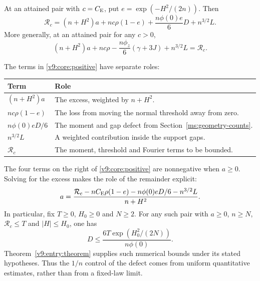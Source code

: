 \begin{theorem}\label{revision:contact-conservation}
At an attained pair with $c=C_{\mathrm E}$, put $e=\exp(-H^2/(2n))$. Then
\begin{equation}\label{v9:core:positive}
 \mathcal R_c=(n+H^2)a+nc\rho(1-e)+\frac{n\phi(0)e}{6}D+n^{3/2}L.
\end{equation}
More generally, at an attained pair for any $c>0$,
\begin{equation}\label{v9:core:conservation}
 (n+H^2)a+nc\rho-\frac{n\phi_z}{6}(\gamma+3J)+n^{3/2}L=\mathcal R_c.
\end{equation}
\end{theorem}
The terms in \eqref{v9:core:positive} have separate roles:
\begin{center}\small
\begin{tabular}{@{}p{.40\linewidth}p{.54\linewidth}@{}}
\toprule
Term & Role \\
\midrule
$(n+H^2)a$ & The excess, weighted by $n+H^2$. \\
$nc\rho(1-e)$ & The loss from moving the normal threshold away from zero. \\
$n\phi(0)eD/6$ & The moment and gap defect from Section~\ref{ms:geometry-counts}. \\
$n^{3/2}L$ & A weighted contribution inside the support gaps. \\
$\mathcal R_c$ & The moment, threshold and Fourier terms to be bounded. \\
\bottomrule
\end{tabular}
\end{center}
The four terms on the right of \eqref{v9:core:positive} are nonnegative
when $a\ge0$. Solving for
the excess makes the role of the remainder explicit:
\begin{equation}\label{opus:excess-identity}
 a=\frac{\mathcal R_c-nC_{\mathrm E}\rho(1-e)-n\phi(0)eD/6-n^{3/2}L}
             {n+H^2}.
\end{equation}
In particular, fix $T\ge0$, $H_0\ge0$ and $N\ge2$. For any such pair
with $a\ge0$, $n\ge N$, $\mathcal R_c\le T$ and $|H|\le H_0$, one has
\[
 D\le\frac{6T\exp(H_0^2/(2N))}{n\phi(0)}.
\]
Theorem~\ref{v9:entry:theorem} supplies such numerical bounds under
its stated hypotheses. Thus the $1/n$ control of the defect comes from
uniform quantitative estimates, rather than from a fixed-law limit.

